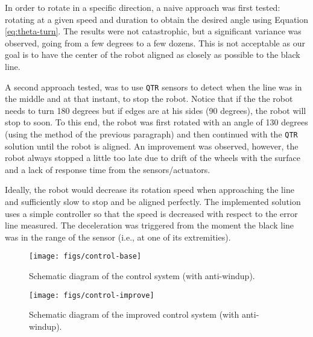 \documentclass[12pt]{report}
\begin{document}
In order to rotate in a specific direction, a naive approach was first tested: rotating at a given speed and duration to obtain the desired angle using Equation \ref{eq:theta-turn}. The results were not catastrophic, but a significant variance was observed, going from a few degrees to a few dozens. This is not acceptable as our goal is to have the center of the robot aligned as closely as possible to the black line. 

A second approach tested, was to use \texttt{QTR} sensors to detect when the line was in the middle and at that instant, to stop the robot. Notice that if the the robot needs to turn 180 degrees but if edges are at his sides (90 degrees), the robot will stop to soon. To this end, the robot was first rotated with an angle of 130 degrees (using the method of the previous paragraph) and then continued with the \texttt{QTR} solution until the robot is aligned. An improvement was observed, however, the robot always stopped a little too late due to drift of the wheels with the surface and a lack of response time from the sensors/actuators.

Ideally, the robot would decrease its rotation speed when approaching the line and sufficiently slow to stop and be aligned perfectly. The implemented solution uses a simple controller so that the speed is decreased with respect to the error line measured. The deceleration was triggered from the moment the black line was in the range of the sensor (i.e., at one of its extremities).

\newpage
\null
\vfill
\begin{figure}[!h]
\centering
\texttt{[image: figs/control-base]}
\caption{Schematic diagram of the control system (with anti-windup).}
\label{fig:control-base}
\end{figure}
\vfill
\begin{figure}[!h]
\centering
\texttt{[image: figs/control-improve]}
\caption{Schematic diagram of the improved control system (with anti-windup).}
\label{fig:control-base}
\end{figure}
\clearpage
\newpage






\end{document}
